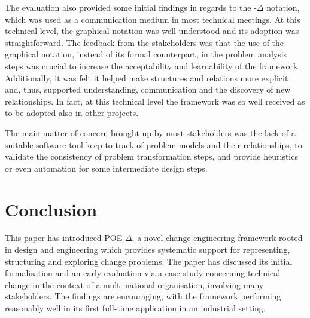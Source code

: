 \documentclass[runningheads,a4paper]{llncs}
\begin{document}
The evaluation also provided some initial findings in regards to the \POE{}-$\Delta$ notation, which was used as a communication medium in most technical meetings. At this technical level, the graphical notation was well understood and its adoption was straightforward. The feedback from the stakeholders was that the use of the graphical notation, instead of its formal counterpart, in the problem analysis steps was crucial to increase the acceptability and learnability of the framework. Additionally, it was felt it helped make structures and relations more explicit and, thus, supported understanding, communication and the discovery of new relationships. In fact, at this technical level the framework was so well received as to be adopted also in other projects. %
%


The main matter of concern brought up by most stakeholders was the lack of a suitable software tool keep to track of problem models and their relationships, to validate the consistency of problem transformation steps, and provide heuristics or even automation for some intermediate design steps. 

\section{Conclusion}\label{sect:Conclusion}
This paper has introduced POE-$\Delta$, a novel change engineering framework rooted in design and engineering which provides systematic support for representing, structuring and exploring change problems. The paper has discussed its initial formalisation and an early evaluation via a case study concerning technical change in the context of a multi-national organisation, involving many stakeholders. The findings are encouraging, with the framework performing reasonably well in its first full-time application in an industrial setting. 
\end{document}

